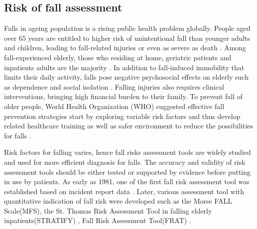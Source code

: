 \documentclass[conference,compsoc]{IEEEtran}
\begin{document}
\subsection{Risk of fall assessment}
Falls in ageing population is a rising public health problem globally. People aged over 65 years are entitled to higher risk of unintentional fall than younger adults and children, leading to fall-related injuries or even as severe as death \cite{who_2012}. Among fall-experienced elderly, those who residing at home, geriatric patients and inpatients adults are the majority \cite{Jung_2014}. In addition to fall-induced immobility that limits their daily activity, falls pose negative psychosocial effects on elderly such as dependence and social isolation \cite{Scheffer_2008}. Falling injuries also requires clinical interventions, bringing high financial burden to their family. 
To prevent fall of older people, World Health Organization (WHO) suggested effective fall prevention strategies start by exploring variable risk factors and thus develop related healthcare training as well as safer environment to reduce the possibilities for falls \cite{who_2012}. 

Risk factors for falling varies, hence fall risks assessment tools are widely studied and used for more efficient diagnosis for falls. The accuracy and validity of risk assessment tools should be either tested or supported by evidence before putting in use by patients. As early as 1981, one of the first fall risk assessment tool was established based on incident report data \cite{Oulton_1981}. Later, various assessment tool with quantitative indication of fall risk were developed such as the Morse FALL Scale(MFS)\cite{Morse_1989}, the St. Thomas Risk Assessment Tool in falling elderly inpatients(STRATIFY) \cite{Oliver_1997}, Fall Risk Assessment Tool(FRAT) \cite{Nandy_2004}.
\end{document}
